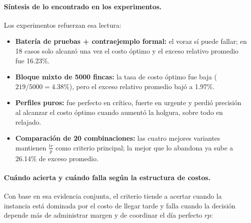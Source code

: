 \documentclass[12pt,a4paper]{article}
\begin{document}
\paragraph{S\'intesis de lo encontrado en los experimentos.}
Los experimentos refuerzan esa lectura:
\begin{itemize}
  \item \textbf{Bater\'ia de pruebas + contraejemplo formal:} el voraz s\'i puede fallar; en 18 casos solo alcanz\'o una vez el costo \'optimo y el exceso relativo promedio fue 16.23\%.
  \item \textbf{Bloque mixto de 5000 fincas:} la tasa de costo \'optimo fue baja (\(219/5000 = 4.38\%\)), pero el exceso relativo promedio baj\'o a 1.97\%.
  \item \textbf{Perfiles puros:} fue perfecto en cr\'itico, fuerte en urgente y perdi\'o precisi\'on al alcanzar el costo \'optimo cuando aument\'o la holgura, sobre todo en relajado.
  \item \textbf{Comparaci\'on de 20 combinaciones:} las cuatro mejores variantes mantienen \(\frac{tr}{p}\) como criterio principal; la mejor que lo abandona ya sube a 26.14\% de exceso promedio.
\end{itemize}

\paragraph{Cu\'ando acierta y cu\'ando falla seg\'un la estructura de costos.}
Con base en esa evidencia conjunta, el criterio tiende a acertar cuando la instancia est\'a dominada por el costo de llegar tarde y falla cuando la decisi\'on depende m\'as de administrar margen y de coordinar el d\'ia perfecto \(rp\):
\end{document}

